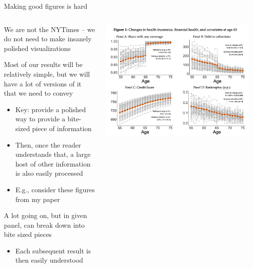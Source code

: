 \documentclass[notes,11pt, aspectratio=169]{beamer}
\newenvironment{wideitemize}{\itemize\addtolength{\itemsep}{10pt}}{\enditemize}
\begin{document}
\begin{frame}{Making good figures is hard}
  \begin{columns}[T] %
    \begin{column}{.6\textwidth}
  \begin{wideitemize}
  \item We are not the NYTimes -- we do not need to make insanely polished visualizations
  \item Most of our results will be relatively simple, but we will
    have a lot of versions of it that we need to convey
    \begin{itemize}
    \item Key: provide a polished way to provide a bite-sized piece of information
    \item Then, once the reader understands that, a large host of
      other information is also easily processed
    \item E.g., consider these figures from my paper
    \end{itemize}
  \item A lot going on, but in given panel, can break down into bite
    sized pieces
    \begin{itemize}
    \item Each subsequent result is then easily understood
    \end{itemize}
  \end{wideitemize}
  \end{column}%
  \hfill%
  \begin{column}{.4\textwidth}
    \includegraphics[width=\linewidth]{gpw_example.png}
  \end{column}
\end{columns}
\end{frame}
\end{document}
